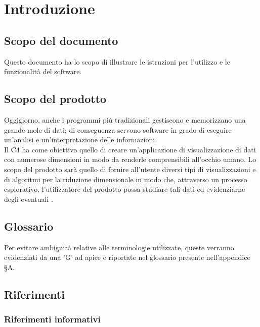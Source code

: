 \section{Introduzione}
\subsection{Scopo del documento}
Questo documento ha lo scopo di illustrare le istruzioni per l'utilizzo e le funzionalità del software.

\subsection{Scopo del prodotto}
Oggigiorno, anche i programmi più tradizionali gestiscono e memorizzano una grande mole di dati; di conseguenza servono software in grado di eseguire un'analisi e un'interpretazione delle informazioni.\\
Il  C4 ha come obiettivo quello di creare un'applicazione di visualizzazione di dati con numerose dimensioni in modo da renderle comprensibili all'occhio umano.  Lo scopo del prodotto sarà quello di fornire all'utente diversi tipi di visualizzazioni e di algoritmi per la riduzione dimensionale in modo che, attraverso un processo esplorativo, l'utilizzatore del prodotto possa studiare tali dati ed evidenziarne degli eventuali . 

\subsection{Glossario}
Per evitare ambiguità relative alle terminologie utilizzate, queste verranno evidenziati da una 'G' ad apice e riportate nel glossario presente nell'appendice \S A.

\subsection{Riferimenti}

\subsubsection{Riferimenti informativi}
\label{riferimenti}
\begin{itemize}
	
\end{itemize}